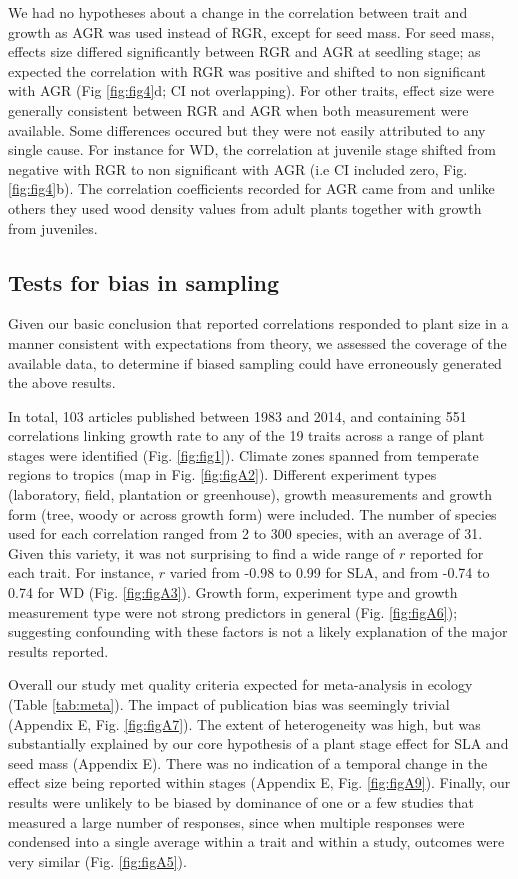 \documentclass[a4paper,11pt]{article}
\begin{document}
We had no hypotheses about a change in the correlation between trait and growth as AGR was used instead of RGR, except for seed mass. For seed mass, effects size differed significantly between RGR and AGR at seedling stage; as expected the correlation with RGR was positive and shifted to non significant with AGR (Fig \ref{fig:fig4}d; CI not overlapping). For other traits, effect size were generally consistent between RGR and AGR when both measurement were available. Some differences occured but they were not easily attributed to any single cause. For instance for WD, the correlation at juvenile stage shifted from negative with RGR to non significant with AGR (i.e CI included zero, Fig. \ref{fig:fig4}b). The correlation coefficients recorded for AGR came from \citet{Augspurger:1984ct} and unlike others they used wood density values from adult plants together with growth from juveniles.

\subsection*{Tests for bias in sampling}

Given our basic conclusion that reported correlations responded to plant size in a manner consistent with expectations from theory, we assessed the coverage of the available data, to determine if biased sampling could have erroneously generated the above results.

In total, 103 articles published between 1983 and 2014, and containing 551 correlations linking growth rate to any of the 19 traits across a range of plant stages were identified (Fig. \ref{fig:fig1}). Climate zones spanned from temperate regions to tropics (map in Fig. \ref{fig:figA2}). Different experiment types (laboratory, field, plantation or greenhouse), growth measurements and growth form (tree, woody or across growth form) were included. The number of species used for each correlation ranged from 2 to 300 species, with an average of 31. Given this variety, it was not surprising to find a wide range of $r$ reported for each trait. For instance, $r$ varied from -0.98 to 0.99 for SLA, and from -0.74 to 0.74 for WD (Fig. \ref{fig:figA3}). Growth form, experiment type and growth measurement type were not strong predictors in general (Fig. \ref{fig:figA6}); suggesting confounding with these factors is not a likely explanation of the major results reported.

Overall our study met quality criteria expected for meta-analysis in ecology (Table \ref{tab:meta}). The impact of publication bias was seemingly trivial (Appendix E, Fig. \ref{fig:figA7}). The extent of heterogeneity was high, but was substantially explained by our core hypothesis of a plant stage effect for SLA and seed mass (Appendix E). There was no indication of a temporal change in the effect size being reported within stages (Appendix E, Fig. \ref{fig:figA9}). Finally, our results were unlikely to be biased by dominance of one or a few studies that measured a large number of responses, since when multiple responses were condensed into a single average within a trait and within a study, outcomes were very similar (Fig. \ref{fig:figA5}).
\end{document}
